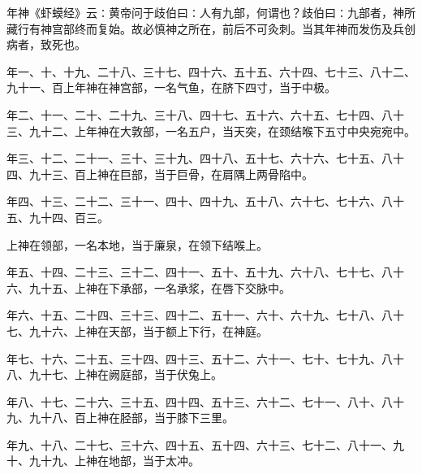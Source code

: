 \documentclass[a4paper,12pt,UTF8,twoside]{ctexbook}
\begin{document}
年神《虾蟆经》云∶黄帝问于歧伯曰∶人有九部，何谓也？歧伯曰∶九部者，神所藏行有神宫部终而复始。故必慎神之所在，前后不可灸刺。当其年神而发伤及兵创病者，致死也。

年一、十、十九、二十八、三十七、四十六、五十五、六十四、七十三、八十二、九十一、百上年神在神宫部，一名气鱼，在脐下四寸，当于中极。

年二、十一、二十、二十九、三十八、四十七、五十六、六十五、七十四、八十三、九十二、上年神在大敦部，一名五户，当天突，在颈结喉下五寸中央宛宛中。

年三、十二、二十一、三十、三十九、四十八、五十七、六十六、七十五、八十四、九十三、百上神在巨部，当于巨骨，在肩隅上两骨陷中。

年四、十三、二十二、三十一、四十、四十九、五十八、六十七、七十六、八十五、九十四、百三。

上神在领部，一名本地，当于廉泉，在领下结喉上。

年五、十四、二十三、三十二、四十一、五十、五十九、六十八、七十七、八十六、九十五、上神在下承部，一名承浆，在唇下交脉中。

年六、十五、二十四、三十三、四十二、五十一、六十、六十九、七十八、八十七、九十六、上神在天部，当于额上下行，在神庭。

年七、十六、二十五、三十四、四十三、五十二、六十一、七十、七十九、八十八、九十七、上神在阙庭部，当于伏兔上。

年八、十七、二十六、三十五、四十四、五十三、六十二、七十一、八十、八十九、九十八、百上神在胫部，当于膝下三里。

年九、十八、二十七、三十六、四十五、五十四、六十三、七十二、八十一、九十、九十九、上神在地部，当于太冲。
\end{document}
